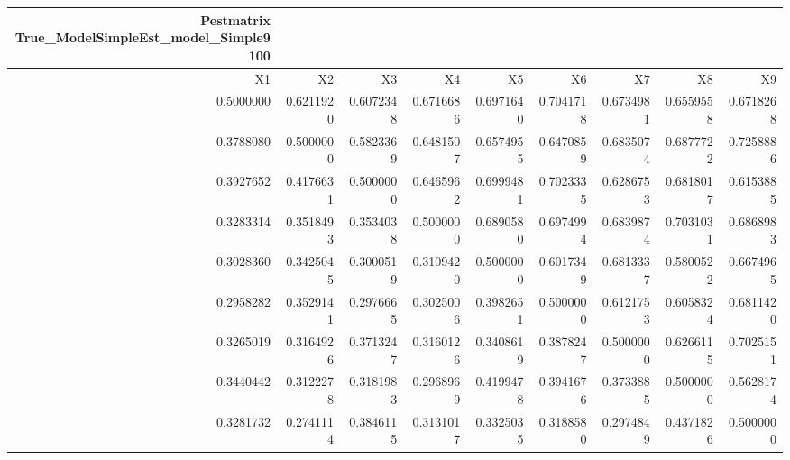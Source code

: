 \begin{longtable}{rrrrrrrrr}
\caption*{
{\large Pestmatrix} \\ 
{\small True\_ModelSimpleEst\_model\_Simple9100}
} \\ 
\toprule
X1 & X2 & X3 & X4 & X5 & X6 & X7 & X8 & X9 \\ 
\midrule
0.5000000 & 0.6211920 & 0.6072348 & 0.6716686 & 0.6971640 & 0.7041718 & 0.6734981 & 0.6559558 & 0.6718268 \\ 
0.3788080 & 0.5000000 & 0.5823369 & 0.6481507 & 0.6574955 & 0.6470859 & 0.6835074 & 0.6877722 & 0.7258886 \\ 
0.3927652 & 0.4176631 & 0.5000000 & 0.6465962 & 0.6999481 & 0.7023335 & 0.6286753 & 0.6818017 & 0.6153885 \\ 
0.3283314 & 0.3518493 & 0.3534038 & 0.5000000 & 0.6890580 & 0.6974994 & 0.6839874 & 0.7031031 & 0.6868983 \\ 
0.3028360 & 0.3425045 & 0.3000519 & 0.3109420 & 0.5000000 & 0.6017349 & 0.6813337 & 0.5800522 & 0.6674965 \\ 
0.2958282 & 0.3529141 & 0.2976665 & 0.3025006 & 0.3982651 & 0.5000000 & 0.6121753 & 0.6058324 & 0.6811420 \\ 
0.3265019 & 0.3164926 & 0.3713247 & 0.3160126 & 0.3408619 & 0.3878247 & 0.5000000 & 0.6266115 & 0.7025151 \\ 
0.3440442 & 0.3122278 & 0.3181983 & 0.2968969 & 0.4199478 & 0.3941676 & 0.3733885 & 0.5000000 & 0.5628174 \\ 
0.3281732 & 0.2741114 & 0.3846115 & 0.3131017 & 0.3325035 & 0.3188580 & 0.2974849 & 0.4371826 & 0.5000000 \\ 
\bottomrule
\end{longtable}

